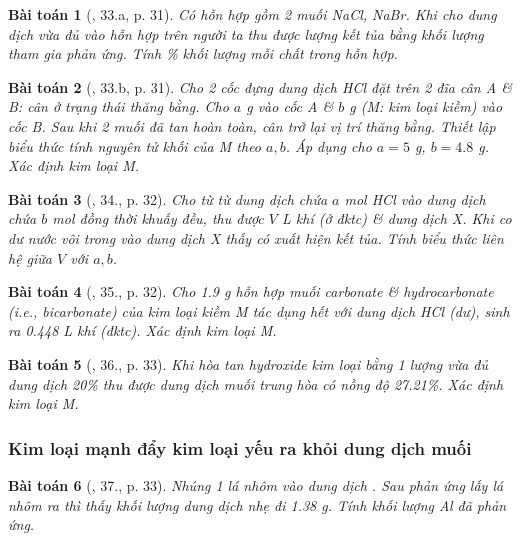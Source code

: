 \documentclass{article}
\newtheorem{baitoan}{Bài toán}
\begin{document}
\begin{baitoan}[\cite{An_350_BT_Hoa_Hoc_9}, 33.a, p. 31]
	Có hỗn hợp gồm 2 muối \emph{NaCl, NaBr}. Khi cho dung dịch \emph{} vừa đủ vào hỗn hợp trên người ta thu được lượng kết tủa bằng khối lượng \emph{} tham gia phản ứng. Tính \% khối lượng mỗi chất trong hỗn hợp.
\end{baitoan}

\begin{baitoan}[\cite{An_350_BT_Hoa_Hoc_9}, 33.b, p. 31]
	Cho 2 cốc đựng dung dịch \emph{HCl} đặt trên 2 đĩa cân A \& B: cân ở trạng thái thăng bằng. Cho $a$ \emph{g } vào cốc A \& $b$ \emph{g } (M: kim loại kiềm) vào cốc B. Sau khi 2 muối đã tan hoàn toàn, cân trở lại vị trí thăng bằng. Thiết lập biểu thức tính nguyên tử khối của M theo $a,b$. Áp dụng cho $a = 5$ \emph{g}, $b = 4.8$ \emph{g}. Xác định kim loại M.
\end{baitoan}

\begin{baitoan}[\cite{An_350_BT_Hoa_Hoc_9}, 34., p. 32]
	Cho từ từ dung dịch chứa $a$ \emph{mol HCl} vào dung dịch chứa $b$ \emph{mol } đồng thời khuấy đều, thu được $V$ \emph{L} khí (ở đktc) \& dung dịch X. Khi co dư nước vôi trong vào dung dịch X thấy có xuất hiện kết tủa. Tính biểu thức liên hệ giữa $V$ với $a,b$.
\end{baitoan}

\begin{baitoan}[\cite{An_350_BT_Hoa_Hoc_9}, 35., p. 32]
	Cho \emph{1.9 g} hỗn hợp muối carbonate \& hydrocarbonate (i.e., bicarbonate) của kim loại kiềm M tác dụng hết với dung dịch \emph{HCl} (dư), sinh ra \emph{0.448 L} khí (đktc). Xác định kim loại M.
\end{baitoan}

\begin{baitoan}[\cite{An_350_BT_Hoa_Hoc_9}, 36., p. 33]
	Khi hòa tan hydroxide kim loại \emph{} bằng 1 lượng vừa đủ dung dịch \emph{ 20\%} thu được dung dịch muối trung hòa có nồng độ \emph{27.21\%}. Xác định kim loại M.
\end{baitoan}

\subsubsection{Kim loại mạnh đẩy kim loại yếu ra khỏi dung dịch muối}

\begin{baitoan}[\cite{An_350_BT_Hoa_Hoc_9}, 37., p. 33]
	Nhúng 1 lá nhôm vào dung dịch \emph{}. Sau phản ứng lấy lá nhôm ra thì thấy khối lượng dung dịch nhẹ đi \emph{1.38 g}. Tính khối lượng \emph{Al} đã phản ứng.
\end{baitoan}
\end{document}
